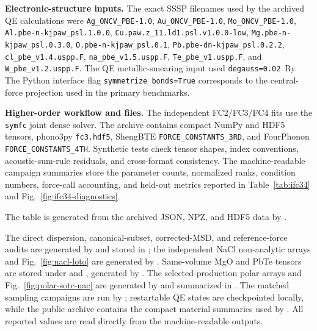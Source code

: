 \documentclass[aps,prb,reprint,amsmath,amssymb,floatfix]{revtex4-2}
\begin{document}
\color{revisionblue}
\textbf{Electronic-structure inputs.} The exact SSSP filenames used by the
archived QE calculations were \texttt{Ag\_ONCV\_PBE-1.0},
\texttt{Au\_ONCV\_PBE-1.0}, \texttt{Mo\_ONCV\_PBE-1.0},
\texttt{Al.pbe-n-kjpaw\_psl.1.0.0},
\texttt{Cu.paw.z\_11.ld1.psl.v1.0.0-low},
\texttt{Mg.pbe-n-kjpaw\_psl.0.3.0},
\texttt{O.pbe-n-kjpaw\_psl.0.1},
\texttt{Pb.pbe-dn-kjpaw\_psl.0.2.2},
\texttt{cl\_pbe\_v1.4.uspp.F}, \texttt{na\_pbe\_v1.5.uspp.F},
\texttt{Te\_pbe\_v1.uspp.F}, and \texttt{W\_pbe\_v1.2.uspp.F}. The QE
metallic-smearing input used \texttt{degauss=0.02}~Ry. The Python interface flag
\texttt{symmetrize\_bonds=True} corresponds to the central-force projection
used in the primary benchmarks.
\color{black}

\color{revisionblue}
\textbf{Higher-order workflow and files.} The independent FC2/FC3/FC4 fits use
the \texttt{symfc} joint dense solver. The archive contains compact NumPy and
HDF5 tensors, phono3py \texttt{fc3.hdf5}, ShengBTE
\texttt{FORCE\_CONSTANTS\_3RD}, and FourPhonon
\texttt{FORCE\_CONSTANTS\_4TH}. Synthetic tests check tensor shapes, index
conventions, acoustic-sum-rule residuals, and cross-format consistency. The
machine-readable campaign summaries store the parameter counts, normalized
ranks, condition numbers, force-call accounting, and held-out metrics reported
in Table~\ref{tab:ifc34} and Fig.~\ref{fig:ifc34-diagnostics}.
\color{black}

\color{revisionblue}
The table is generated from the archived JSON, NPZ, and HDF5 data by
.
\color{black}

\color{revisionblue}
The direct dispersion, canonical-subset, corrected-MSD, and reference-force
audits are generated by 
and stored in ;
the independent NaCl non-analytic arrays and Fig.~\ref{fig:nacl-loto} are
generated by .
Same-volume MgO and PbTe tensors are stored under
 and
, generated by
.
The selected-production polar arrays and Fig.~\ref{fig:polar-sotc-nac} are
generated by  and summarized in
.
The matched sampling campaigns are run by
; restartable QE states
are checkpointed locally, while the public archive contains the compact
material summaries used by
.
All reported values are read directly from the machine-readable outputs.
\color{black}
\end{document}
